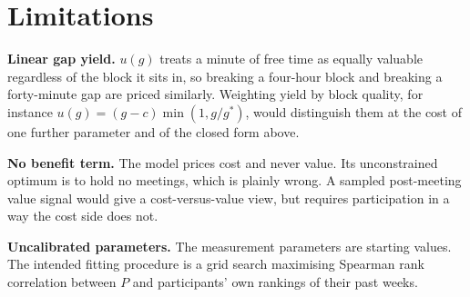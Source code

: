 \documentclass[11pt]{article}
\begin{document}
\section{Limitations}

\textbf{Linear gap yield.} $u(g)$ treats a minute of free time as equally
valuable regardless of the block it sits in, so breaking a four-hour block
and breaking a forty-minute gap are priced similarly. Weighting yield by
block quality, for instance $u(g) = (g - c)\min(1, g/g^{*})$, would
distinguish them at the cost of one further parameter and of the closed form
above.

\textbf{No benefit term.} The model prices cost and never value. Its
unconstrained optimum is to hold no meetings, which is plainly wrong. A
sampled post-meeting value signal would give a cost-versus-value view, but
requires participation in a way the cost side does not.

\textbf{Uncalibrated parameters.} The measurement parameters are starting
values. The intended fitting procedure is a grid search maximising Spearman
rank correlation between $P$ and participants' own rankings of their past
weeks.
\end{document}
